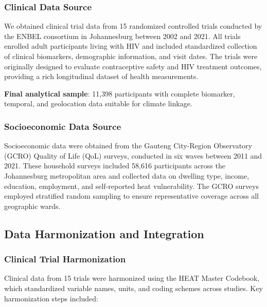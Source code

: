 \subsubsection{Clinical Data Source}

We obtained clinical trial data from 15 randomized controlled trials conducted by the ENBEL consortium in Johannesburg between 2002 and 2021. All trials enrolled adult participants living with HIV and included standardized collection of clinical biomarkers, demographic information, and visit dates. The trials were originally designed to evaluate contraceptive safety and HIV treatment outcomes, providing a rich longitudinal dataset of health measurements.

\textbf{Final analytical sample}: 11,398 participants with complete biomarker, temporal, and geolocation data suitable for climate linkage.

\subsubsection{Socioeconomic Data Source}

Socioeconomic data were obtained from the Gauteng City-Region Observatory (GCRO) Quality of Life (QoL) surveys, conducted in six waves between 2011 and 2021. These household surveys included 58,616 participants across the Johannesburg metropolitan area and collected data on dwelling type, income, education, employment, and self-reported heat vulnerability. The GCRO surveys employed stratified random sampling to ensure representative coverage across all geographic wards.

\subsection{Data Harmonization and Integration}

\subsubsection{Clinical Trial Harmonization}

Clinical data from 15 trials were harmonized using the HEAT Master Codebook, which standardized variable names, units, and coding schemes across studies. Key harmonization steps included:

